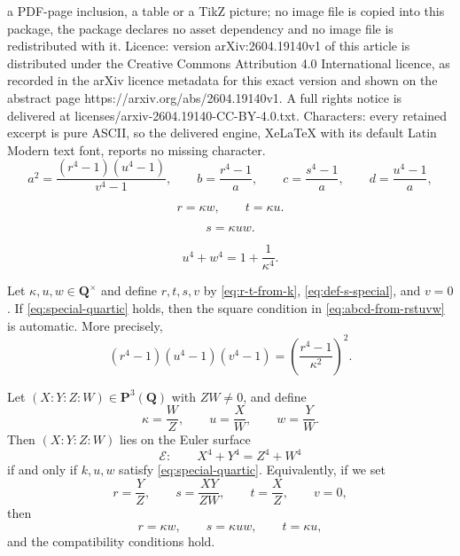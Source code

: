 \documentclass[10pt,a4paper]{amsart}
\newcommand{\Eul}{\mathcal{E}}
\newcommand{\Pj}{\mathbf{P}}
\newcommand{\Q}{\mathbf{Q}}
\begin{document}
a PDF-page inclusion, a table or a TikZ picture; no image file is copied into this package, the package declares no asset dependency and no image file is redistributed with it. Licence: version arXiv:2604.19140v1 of this article is distributed under the Creative Commons Attribution 4.0 International licence, as recorded in the arXiv licence metadata for this exact version and shown on the abstract page https://arxiv.org/abs/2604.19140v1. A full rights notice is delivered at licenses/arxiv-2604.19140-CC-BY-4.0.txt. Characters: every retained excerpt is pure ASCII, so the delivered engine, XeLaTeX with its default Latin Modern text font, reports no missing character.
\begin{equation}\label{eq:abcd-from-rstuvw}
a^2=\frac{(r^4-1)(u^4-1)}{v^4-1},\qquad
b=\frac{r^4-1}{a},\qquad
c=\frac{s^4-1}{a},\qquad
d=\frac{u^4-1}{a},
\end{equation}

\begin{equation}\label{eq:r-t-from-k}
r=\kappa w,\qquad t=\kappa u.
\end{equation}

\begin{equation}\label{eq:def-s-special}
s=\kappa uw.
\end{equation}

\begin{equation}\label{eq:special-quartic}
u^4+w^4=1+\frac{1}{\kappa^4}.
\end{equation}

\begin{proposition}\label{prop:auto-square-special}
Let $\kappa,u,w\in\Q^\times$ and define $r,t,s,v$ by \eqref{eq:r-t-from-k}, \eqref{eq:def-s-special}, and $v=0$. If \eqref{eq:special-quartic} holds, then the square condition in \eqref{eq:abcd-from-rstuvw} is automatic. More precisely,
\[
(r^4-1)(u^4-1)(v^4-1)=\left(\frac{r^4-1}{\kappa^2}\right)^2.
\]
\end{proposition}

\begin{proposition}\label{prop:euler-specialization}
Let $(X:Y:Z:W)\in\Pj^3(\Q)$ with $ZW\neq 0$, and define
\begin{equation}\label{eq:k-u-w-from-euler}
\kappa=\frac{W}{Z},\qquad u=\frac{X}{W},\qquad w=\frac{Y}{W}.
\end{equation}
Then $(X:Y:Z:W)$ lies on the Euler surface
\[
\Eul:\qquad X^4+Y^4=Z^4+W^4
\]
if and only if $k,u,w$ satisfy \eqref{eq:special-quartic}. Equivalently, if we set
\[
r=\frac{Y}{Z},\qquad s=\frac{XY}{ZW},\qquad t=\frac{X}{Z},\qquad v=0,
\]
then
\[
r=\kappa w,\qquad s=\kappa uw,\qquad t=\kappa u,
\]
and the compatibility conditions hold.
\end{proposition}
\end{document}
